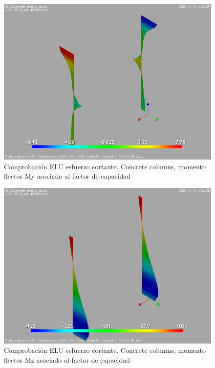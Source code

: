 \begin{figure}[ht]
\begin{center}
\includegraphics[width=\linewidth]{results/graphics/shearULS/columnZconcrMy}
\caption{Comprobación ELU esfuerzo cortante. Concrete columns, momento flector My asociado al factor de capacidad}
\label{ULS_shearResistancecolumnZconcrMy}
\end{center}
\end{figure}
\begin{figure}[ht]
\begin{center}
\includegraphics[width=\linewidth]{results/graphics/shearULS/columnZconcrMz}
\caption{Comprobación ELU esfuerzo cortante. Concrete columns, momento flector Mz asociado al factor de capacidad}
\label{ULS_shearResistancecolumnZconcrMz}
\end{center}
\end{figure}
